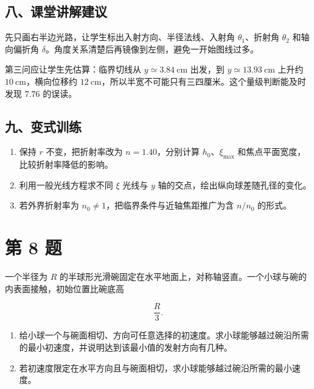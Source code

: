 \documentclass[12pt,a4paper,UTF8]{ctexart}
\newcommand{\tightlist}{\setlength{\itemsep}{0pt}\setlength{\parskip}{0pt}}
\begin{document}
\subsection{八、课堂讲解建议}\label{ux516bux8bfeux5802ux8bb2ux89e3ux5efaux8bae-6}

先只画右半边光路，让学生标出入射方向、半径法线、入射角
\(\theta_1\)、折射角 \(\theta_2\) 和轴向偏折角
\(\delta\)。角度关系清楚后再镜像到左侧，避免一开始图线过多。

第三问应让学生先估算：临界切线从 \(y\simeq3.84\ \mathrm{cm}\) 出发，到
\(y\simeq13.93\ \mathrm{cm}\) 上升约 \(10\ \mathrm{cm}\)，横向位移约
\(12\ \mathrm{cm}\)，所以半宽不可能只有三四厘米。这个量级判断能及时发现
\(7.76\) 的误读。

\subsection{九、变式训练}\label{ux4e5dux53d8ux5f0fux8badux7ec3-6}

\begin{enumerate}
\def\labelenumi{\arabic{enumi}.}
\tightlist
\item
  保持 \(r\) 不变，把折射率改为 \(n=1.40\)，分别计算
  \(h_0\)、\(\xi_{\max}\) 和焦点平面宽度，比较折射率降低的影响。
\item
  利用一般光线方程求不同 \(\xi\) 光线与 \(y\)
  轴的交点，绘出纵向球差随孔径的变化。
\item
  若外界折射率为 \(n_0\ne1\)，把临界条件与近轴焦距推广为含 \(n/n_0\)
  的形式。
\end{enumerate}

\newpage

\section{第 8 题}\label{ux7b2c-8-ux9898}

一个半径为 \(R\)
的半球形光滑碗固定在水平地面上，对称轴竖直。一个小球与碗的内表面接触，初始位置比碗底高

\[\frac R3.\]

\begin{enumerate}
\def\labelenumi{\arabic{enumi}.}
\tightlist
\item
  给小球一个与碗面相切、方向可任意选择的初速度。求小球能够越过碗沿所需的最小初速度，并说明达到该最小值的发射方向有几种。
\item
  若初速度限定在水平方向且与碗面相切，求小球能够越过碗沿所需的最小速度。
\end{enumerate}
\end{document}
